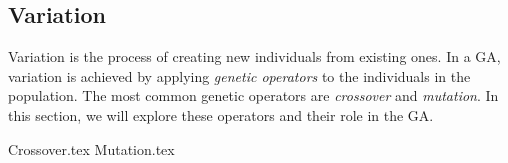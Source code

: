 \subsection{Variation}
\label{sec:genetic_algorithms:variation}
  Variation is the process of creating new individuals from existing ones.
  In a GA, variation is achieved by applying \emph{genetic operators} to the individuals in the
  population.
  The most common genetic operators are \emph{crossover} and \emph{mutation}.
  In this section, we will explore these operators and their role in the GA.

  {Crossover.tex}
  {Mutation.tex}
%